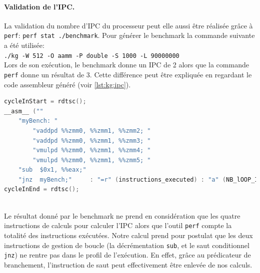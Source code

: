         
        \paragraph{Validation de l'IPC.} 
        
            La validation du nombre d'\gls{IPC} du processeur peut elle aussi être réalisée grâce à \verb|perf|: \verb|perf stat ./benchmark|. Pour générer le benchmark la commande suivante a été utilisée:\\
            \verb|./kg -W 512 -O aamm -P double -S 1000 -L 90000000|\\
            Lors de son exécution, le benchmark donne un IPC de 2 alors que la commande \verb|perf| donne un résultat de 3. Cette différence peut être expliquée en regardant le code assembleur généré (voir \autoref{lst:kg:ipc}).
        
\begin{minipage}{0.965\linewidth}
        \begin{lstlisting}[label=lst:kg:ipc ,language=C, caption={Code généré par la commande ./kg -W 512 -O aamm -P double. Le benchmark mesure la performance de la boucle à l'aide du compteur de cycle (\texttt{rdtsc()}). Cette mesure comprend l'exécution des instructions de calculs du kernel mais aussi les deux instructions de la gestion de boucle \texttt{sub} et \texttt{jnz}.}]
cycleInStart = rdtsc();
__asm__ ("" 
    "myBench: " 
		"vaddpd %%zmm0, %%zmm1, %%zmm2; "
		"vaddpd %%zmm0, %%zmm1, %%zmm3; "
		"vmulpd %%zmm0, %%zmm1, %%zmm4; "
		"vmulpd %%zmm0, %%zmm1, %%zmm5; "
    "sub  $0x1, %%eax;"
    "jnz  myBench;"		: "=r" (instructions_executed) : "a" (NB_lOOP_IN));
cycleInEnd = rdtsc();
\end{lstlisting}
\end{minipage}\\
            Le résultat donné par le benchmark ne prend en considération que les quatre instructions de calculs pour calculer l'IPC alors que l'outil \verb|perf| compte la totalité des instructions exécutées. Notre calcul prend pour postulat que les deux instructions de gestion de boucle (la décrémentation \verb|sub|, et le saut conditionnel \verb|jnz|) ne rentre pas dans le profil de l'exécution. En effet, grâce au prédicateur de branchement, l'instruction de saut peut effectivement être enlevée de nos calculs. 

